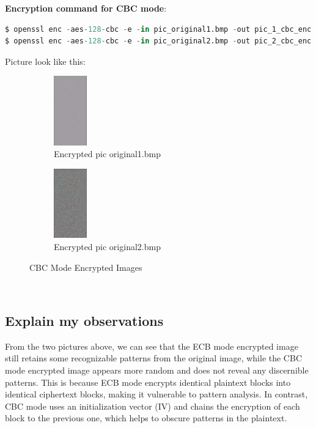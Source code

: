 \documentclass{article}
\begin{document}
\textbf{Encryption command for CBC mode}:
\begin{lstlisting}[language=Python]
$ openssl enc -aes-128-cbc -e -in pic_original1.bmp -out pic_1_cbc_enc.bmp -K 00112233445566778889aabbccddeeff -iv 0102030405060708090a0b0c0d0e0f10
$ openssl enc -aes-128-cbc -e -in pic_original2.bmp -out pic_2_cbc_enc.bmp -K 00112233445566778889aabbccddeeff -iv 0102030405060708090a0b0c0d0e0f10
\end{lstlisting}
Picture look like this:
\begin{figure}[h]
    \centering
    \begin{subfigure}{0.45\textwidth}
        \centering
        \includegraphics[height=3cm]{images/pic_1_cbc.png}
        \caption{Encrypted pic original1.bmp}
    \end{subfigure}
    \begin{subfigure}{0.45\textwidth}
        \centering
        \includegraphics[height=3cm]{images/pic_2_cbc.png}
        \caption{Encrypted pic original2.bmp}
    \end{subfigure}
    \caption{CBC Mode Encrypted Images}
\end{figure}\\
\subsection{Explain my observations}
From the two pictures above, we can see that the ECB mode encrypted image still retains some recognizable patterns from the original image, while the CBC mode encrypted image appears more random and does not reveal any discernible patterns. This is because ECB mode encrypts identical plaintext blocks into identical ciphertext blocks, making it vulnerable to pattern analysis. In contrast, CBC mode uses an initialization vector (IV) and chains the encryption of each block to the previous one, which helps to obscure patterns in the plaintext.
\end{document}
